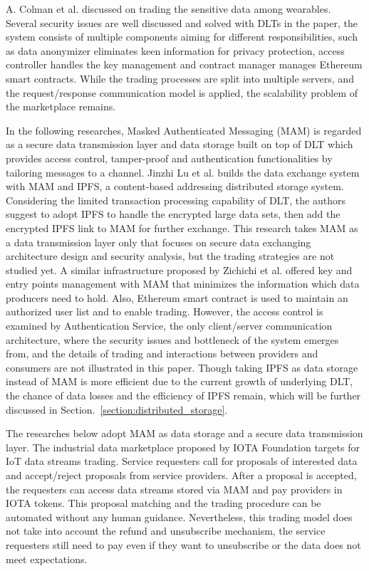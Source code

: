 \begin{spacing}{2.0}
A. Colman et al. \cite{TrustedMarketplaceWearable} discussed on trading the sensitive data among wearables. Several security issues are well discussed and solved with DLTs in the paper, the system consists of multiple components aiming for different responsibilities, such as data anonymizer eliminates keen information for privacy protection, access controller handles the key management and contract manager manages Ethereum smart contracts. While the trading processes are split into multiple servers, and the request/response communication model is applied, the scalability problem of the marketplace remains.

In the following researches, Masked Authenticated Messaging (MAM)\cite{MAM} is regarded as a secure data transmission layer and data storage built on top of DLT which provides access control, tamper-proof and authentication functionalities by tailoring messages to a channel. Jinzhi Lu et al.\cite{luDecentralizedDM} builds the data exchange system with MAM and IPFS\cite{IPFS}, a content-based addressing distributed storage system. Considering the limited transaction processing capability of DLT, the authors suggest to adopt IPFS to handle the encrypted large data sets, then add the encrypted IPFS link to MAM for further exchange. This research takes MAM as a data transmission layer only that focuses on secure data exchanging architecture design and security analysis, but the trading strategies are not studied yet. A similar infrastructure proposed by Zichichi et al.\cite{SocialGood} offered key and entry points management with MAM that minimizes the information which data producers need to hold. Also, Ethereum smart contract is used to maintain an authorized user list and to enable trading. However, the access control is examined by Authentication Service, the only client/server communication architecture, where the security issues and bottleneck of the system emerges from, and the details of trading and interactions between providers and consumers are not illustrated in this paper. Though taking IPFS as data storage instead of MAM is more efficient due to the current growth of underlying DLT, the chance of data losses and the efficiency of IPFS remain, which will be further discussed in Section.~\ref{section:distributed_storage}.

The researches below adopt MAM as data storage and a secure data transmission layer. The industrial data marketplace\cite{IOTAIdustryMarketplace} proposed by IOTA Foundation targets for IoT data streams trading. Service requesters call for proposals of interested data and accept/reject proposals from service providers. After a proposal is accepted, the requesters can access data streams stored via MAM and pay providers in IOTA tokens. This proposal matching and the trading procedure can be automated without any human guidance\cite{IOTAIdustryMarketplaceWithoutHuman}. Nevertheless, this trading model does not take into account the refund and unsubscribe mechanism, the service requesters still need to pay even if they want to unsubscribe or the data does not meet expectations.


\end{spacing}

